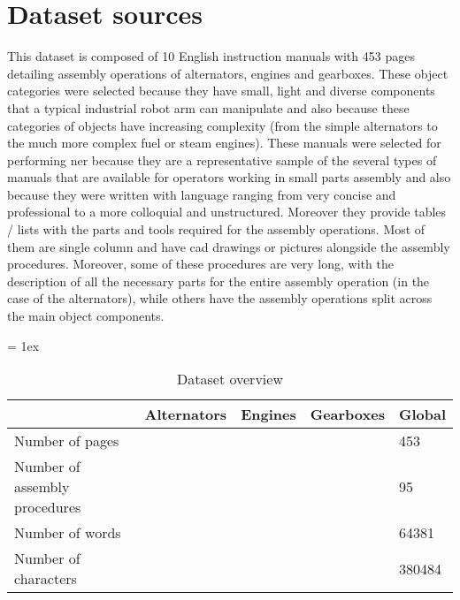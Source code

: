 \section{Dataset sources}\label{sec:dataset-sources}

This dataset is composed of 10 English instruction manuals with 453 pages detailing assembly operations of alternators, engines and gearboxes. These object categories were selected because they have small, light and diverse components that a typical industrial robot arm can manipulate and also because these categories of objects have increasing complexity (from the simple alternators to the much more complex fuel or steam engines). These manuals were selected for performing \gls{ner} because they are a representative sample of the several types of manuals that are available for operators working in small parts assembly and also because they were written with language ranging from very concise and professional to a more colloquial and unstructured. Moreover they provide tables / lists with the parts and tools required for the assembly operations. Most of them are single column and have \gls{cad} drawings or pictures alongside the assembly procedures. Moreover, some of these procedures are very long, with the description of all the necessary parts for the entire assembly operation (in the case of the alternators), while others have the assembly operations split across the main object components.

\begin{table*}[t]
	\caption{Dataset overview}
	\tabulinesep = 1ex
	\centering
	\small
	\begin{tabu} { X[2.5,m,c] | X[m,c] X[m,c] X[m,c] X[m,c] }
		\rowfont{\bfseries\itshape} 	& Alternators									& Engines																& Gearboxes 										& Global 	\\
		\hline
		Number of pages 				& 			& 						& 			& 453		\\
		Number of assembly procedures 	& 				& 							& 				& 95		\\
		Number of words					& 	& 		& 		& 64381		\\
		Number of characters			& 	& 	& 	& 380484	\\
	\end{tabu}
	\label{tab:dataset-sources_dataset-overview}
\end{table*}
